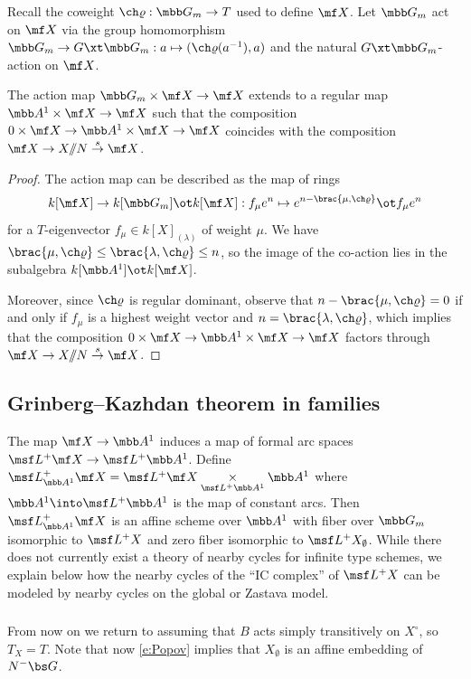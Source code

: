 Recall the coweight $\ch\varrho: \mbb G_m \to T$ used to define $\mf X$.
Let $\mbb G_m$ act on $\mf X$ via the group homomorphism
$\mbb G_m \to G \xt \mbb G_m : a \mapsto (\ch\varrho(a^{-1}), a)$ and the
natural $G\xt \mbb G_m$-action on $\mf X$.

\begin{lem}
\notready \label{lem:contraction}
The action map $\mbb G_m \times \mf X \to \mf X$ extends to a regular map
$\mbb A^1 \times \mf X \to \mf X$ such that the composition $0 \times \mf X \to \mbb A^1 \times \mf X \to \mf X$ coincides with the composition $\mf X \to X/\!\!/N \overset{s}\to \mf X$.
\end{lem}
\begin{proof}
The action map can be described as the map of rings
\[ k[\mf X] \to k[\mbb G_m] \ot k[\mf X] : f_\mu e^n \mapsto
e^{n-\brac{\mu,\ch\varrho}} \ot f_\mu e^n  \]
for a $T$-eigenvector $f_\mu \in k[X]_{(\lambda)}$ of weight $\mu$.
We have $\brac{\mu,\ch\varrho} \le \brac{\lambda,\ch\varrho} \le n$,
so the image of the co-action lies in the subalgebra
$k[\mbb A^1] \ot k[\mf X]$.

Moreover, since $\ch\varrho$ is regular dominant, observe that $n-\brac{\mu,\ch\varrho}=0$
if and only if $f_\mu$ is a highest weight vector
and $n=\brac{\lambda,\ch\varrho}$,
which implies that the composition $0\times \mf X \to \mbb A^1 \times \mf X \to \mf X$
factors through $\mf X \to X/\!\!/N \overset s \to \mf X$.
\end{proof}


\subsection{Grinberg--Kazhdan theorem in families}
The map $\mf X \to \mbb A^1$
induces a map of formal arc spaces $\msf L^+ \mf X \to \msf L^+ \mbb A^1$. Define
$\msf L^+_{\mbb A^1} \mf X = \msf L^+ \mf X \underset{\msf L^+ \mbb A^1}\times \mbb A^1$
where $\mbb A^1 \into \msf L^+ \mbb A^1$ is the map of constant
arcs. Then $\msf L^+_{\mbb A^1} \mf X$ is an affine scheme over $\mbb A^1$
with fiber over $\mbb G_m$ isomorphic to $\msf L^+X$ and zero fiber isomorphic to
$\msf L^+ X_\emptyset$.
While there does not currently exist a theory of nearby cycles for infinite type
schemes, we explain below how the nearby cycles of the ``IC complex'' of
$\msf L^+ X$ can be modeled by nearby cycles on the global or Zastava model.


\subsubsection{}
From now on we return to assuming that $B$ acts simply transitively on $X^\circ$,
so $T_X=T$. Note that now \eqref{e:Popov} implies that $X_\emptyset$ is an
affine embedding of $N^-\bs G$.




